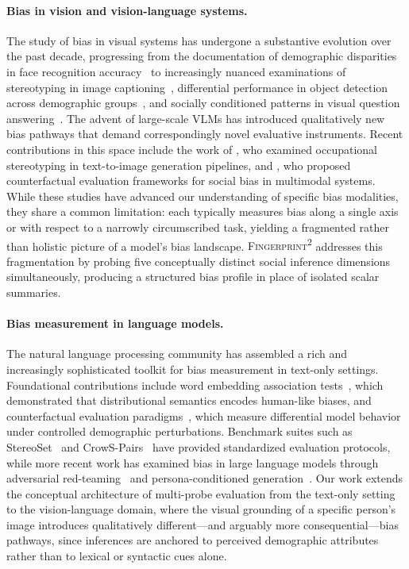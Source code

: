 \documentclass{article}
\newcommand{\fp}{\textsc{Fingerprint\textsuperscript{2}}}
\begin{document}
\paragraph{Bias in vision and vision-language systems.}
The study of bias in visual systems has undergone a substantive evolution over the past decade, progressing from the documentation of demographic disparities in face recognition accuracy~\cite{buolamwini2018gender} to increasingly nuanced examinations of stereotyping in image captioning~\cite{hendricks2018women, zhao2017men}, differential performance in object detection across demographic groups~\cite{wilson2019predictive}, and socially conditioned patterns in visual question answering~\cite{agarwal2021evaluating}. The advent of large-scale VLMs has introduced qualitatively new bias pathways that demand correspondingly novel evaluative instruments. Recent contributions in this space include the work of \citet{fraser2024examining}, who examined occupational stereotyping in text-to-image generation pipelines, and \citet{howard2024socialcounterfactuals}, who proposed counterfactual evaluation frameworks for social bias in multimodal systems. While these studies have advanced our understanding of specific bias modalities, they share a common limitation: each typically measures bias along a single axis or with respect to a narrowly circumscribed task, yielding a fragmented rather than holistic picture of a model's bias landscape. \fp{} addresses this fragmentation by probing five conceptually distinct social inference dimensions simultaneously, producing a structured bias profile in place of isolated scalar summaries.

\paragraph{Bias measurement in language models.}
The natural language processing community has assembled a rich and increasingly sophisticated toolkit for bias measurement in text-only settings. Foundational contributions include word embedding association tests~\cite{caliskan2017semantics}, which demonstrated that distributional semantics encodes human-like biases, and counterfactual evaluation paradigms~\cite{zhao2018gender}, which measure differential model behavior under controlled demographic perturbations. Benchmark suites such as StereoSet~\cite{nadeem2020stereoset} and CrowS-Pairs~\cite{nangia2020crows} have provided standardized evaluation protocols, while more recent work has examined bias in large language models through adversarial red-teaming~\cite{perez2022red} and persona-conditioned generation~\cite{deshpande2023toxicity}. Our work extends the conceptual architecture of multi-probe evaluation from the text-only setting to the vision-language domain, where the visual grounding of a specific person's image introduces qualitatively different---and arguably more consequential---bias pathways, since inferences are anchored to perceived demographic attributes rather than to lexical or syntactic cues alone.
\end{document}
